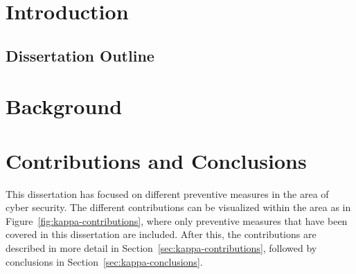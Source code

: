 \chapter{Introduction}
\section{Dissertation Outline}
\chapter{Background}
\chapter{Contributions and Conclusions}

This dissertation has focused on different preventive measures in the area of cyber security.
The different contributions can be visualized within the area as in Figure~\ref{fig:kappa-contributions}, where only preventive measures that have been covered in this dissertation are included.
After this, the contributions are described in more detail in Section~\ref{sec:kappa-contributions}, followed by conclusions in Section~\ref{sec:kappa-conclusions}.

